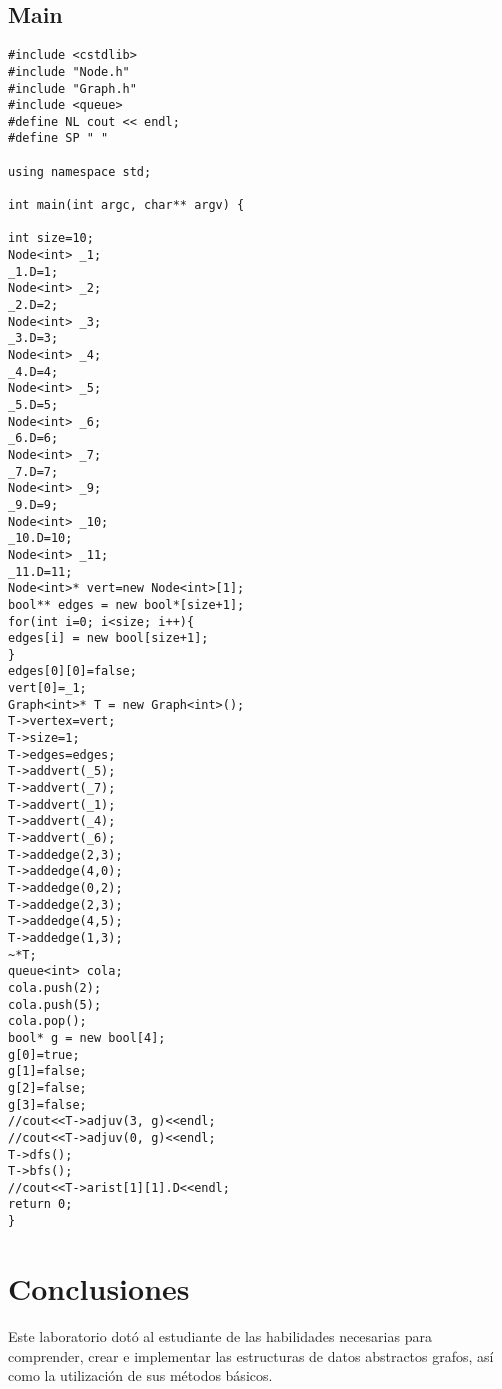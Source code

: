 \documentclass[11pt]{article}
\begin{document}
\subsection{Main}
\begin{lstlisting}
#include <cstdlib>
#include "Node.h"
#include "Graph.h"
#include <queue>
#define NL cout << endl;
#define SP " "

using namespace std;

int main(int argc, char** argv) {

int size=10;
Node<int> _1;
_1.D=1;
Node<int> _2;
_2.D=2;
Node<int> _3;
_3.D=3;
Node<int> _4;
_4.D=4;
Node<int> _5;
_5.D=5;
Node<int> _6;
_6.D=6;
Node<int> _7;
_7.D=7;
Node<int> _9;
_9.D=9;
Node<int> _10;
_10.D=10;
Node<int> _11;
_11.D=11;
Node<int>* vert=new Node<int>[1];
bool** edges = new bool*[size+1];
for(int i=0; i<size; i++){
edges[i] = new bool[size+1];
}
edges[0][0]=false;
vert[0]=_1;
Graph<int>* T = new Graph<int>();
T->vertex=vert;
T->size=1;
T->edges=edges;
T->addvert(_5);
T->addvert(_7);
T->addvert(_1);
T->addvert(_4);
T->addvert(_6);
T->addedge(2,3);
T->addedge(4,0);
T->addedge(0,2);
T->addedge(2,3);
T->addedge(4,5);
T->addedge(1,3);
~*T;
queue<int> cola;
cola.push(2);
cola.push(5);
cola.pop();
bool* g = new bool[4];
g[0]=true;
g[1]=false;
g[2]=false;
g[3]=false;
//cout<<T->adjuv(3, g)<<endl;
//cout<<T->adjuv(0, g)<<endl;
T->dfs();
T->bfs();
//cout<<T->arist[1][1].D<<endl;
return 0;
}

\end{lstlisting}

\section{Conclusiones}
Este laboratorio dotó al estudiante de las habilidades necesarias para comprender, crear e implementar las estructuras de datos abstractos grafos, así como la utilización de sus métodos básicos.
\end{document}
